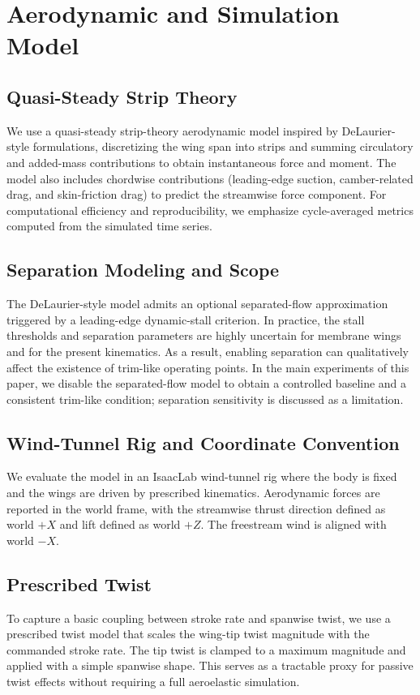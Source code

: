 \section{Aerodynamic and Simulation Model}
\subsection{Quasi-Steady Strip Theory}
We use a quasi-steady strip-theory aerodynamic model inspired by DeLaurier-style formulations, discretizing the wing span into strips and summing circulatory and added-mass contributions to obtain instantaneous force and moment.
The model also includes chordwise contributions (leading-edge suction, camber-related drag, and skin-friction drag) to predict the streamwise force component.
For computational efficiency and reproducibility, we emphasize cycle-averaged metrics computed from the simulated time series.

\subsection{Separation Modeling and Scope}
The DeLaurier-style model admits an optional separated-flow approximation triggered by a leading-edge dynamic-stall criterion.
In practice, the stall thresholds and separation parameters are highly uncertain for membrane wings and for the present kinematics.
As a result, enabling separation can qualitatively affect the existence of trim-like operating points.
In the main experiments of this paper, we disable the separated-flow model to obtain a controlled baseline and a consistent trim-like condition; separation sensitivity is discussed as a limitation.

\subsection{Wind-Tunnel Rig and Coordinate Convention}
We evaluate the model in an IsaacLab wind-tunnel rig where the body is fixed and the wings are driven by prescribed kinematics.
Aerodynamic forces are reported in the world frame, with the streamwise thrust direction defined as world $+X$ and lift defined as world $+Z$.
The freestream wind is aligned with world $-X$.

\subsection{Prescribed Twist}
To capture a basic coupling between stroke rate and spanwise twist, we use a prescribed twist model that scales the wing-tip twist magnitude with the commanded stroke rate.
The tip twist is clamped to a maximum magnitude and applied with a simple spanwise shape.
This serves as a tractable proxy for passive twist effects without requiring a full aeroelastic simulation.
